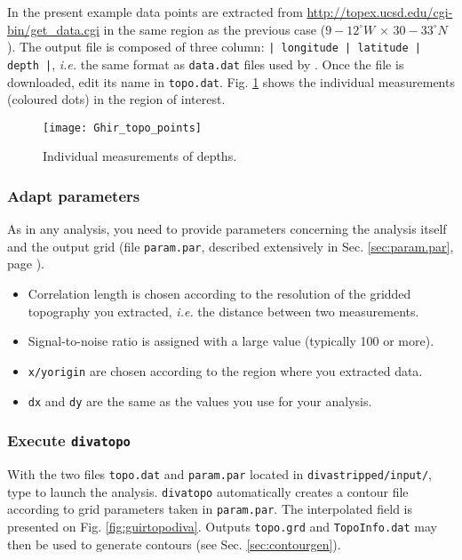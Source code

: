 In the present example data points are extracted from \url{http://topex.ucsd.edu/cgi-bin/get_data.cgi} in the same region as the previous case ($9-12^{\circ}W\, \times\, 30-33^{\circ}N$). The output file is composed of three column: \texttt{| longitude | latitude | depth |}, \textit{i.e.} the same format as \texttt{data.dat} files used by \diva. Once the file is downloaded, edit its name in \texttt{topo.dat}. Fig. \ref{fig:guirtopo} shows the individual measurements (coloured dots) in the region of interest. 


\begin{figure}[htpb]
\centering
\texttt{[image: Ghir\_topo\_points]}
\caption{Individual measurements of depths.\label{fig:guirtopo}}
\end{figure}


\subsubsection{Adapt parameters}

As in any \diva analysis, you need to provide parameters concerning the analysis itself and the output grid (file \texttt{param.par}, described extensively in Sec. \ref{sec:param.par}, page \pageref{sec:param.par}). 

\begin{itemize}
\item Correlation length is chosen according to the resolution of the gridded topography you extracted, \textit{i.e.} the distance between two measurements.
\item Signal-to-noise ratio is assigned with a large value (typically 100 or more).
\item \texttt{x/yorigin} are chosen according to the region where you extracted data.
\item \texttt{dx} and \texttt{dy} are the same as the values you use for your analysis. 
\end{itemize}



\subsubsection{Execute \texttt{divatopo}}

With the two files \texttt{topo.dat} and \texttt{param.par} located in \texttt{divastripped/input/}, type  to launch the analysis. \texttt{divatopo} automatically creates a contour file according to grid parameters taken in \texttt{param.par}. The interpolated field is presented on Fig. \ref{fig:guirtopodiva}. Outputs \texttt{topo.grd} and \texttt{TopoInfo.dat} may then be used to generate contours (see Sec. \ref{sec:contourgen}). 



